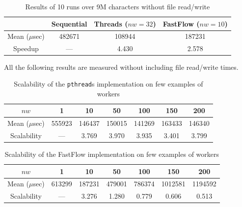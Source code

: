 \documentclass[10pt]{article}
\begin{document}
\begin{table}[H]
\begin{center}
	\begin{tabular}{c || c | c | c}
	& Sequential & Threads ($nw = 32$) & FastFlow ($nw = 10$)\\
	\hline
	Mean ($\mu$sec) & 482671 & 108944 & 187231 \\
	\hline
	Speedup & --- & 4.430 & 2.578
	\end{tabular}
\end{center}
\caption{Results of 10 runs over 9M characters without file read/write}
\label{table:experiments_wofile}
\end{table}
All the following results are measured without including file read/write times.
\begin{table}[H]
\begin{center}
	\begin{tabular}{c || c c c c c c}
	$nw$ & 1 & 10 & 50 & 100 & 150 & 200\\
	\hline
	Mean ($\mu$sec) & 555923 & 146437 & 150015 & 141269 & 163433 & 146340\\
	\hline
	Scalability & --- & 3.769 & 3.970 & 3.935 & 3.401 & 3.799
	\end{tabular}
\end{center}
\caption{Scalability of the \texttt{pthread}s implementation on few examples of workers}
\label{table:scalability_threads}
\end{table}
\begin{table}[H]
\begin{center}
	\begin{tabular}{c || c c c c c c}
	$nw$ & 1 & 10 & 50 & 100 & 150 & 200\\
	\hline
	Mean ($\mu$sec) & 613299 & 187231 & 479001 & 786374 & 1012581 & 1194592\\
	\hline
	Scalability & --- & 3.276 & 1.280 & 0.779 & 0.606 & 0.513
	\end{tabular}
\end{center}
\caption{Scalability of the FastFlow implementation on few examples of workers}
\label{table:scalability_fastflow}
\end{table}
\end{document}
